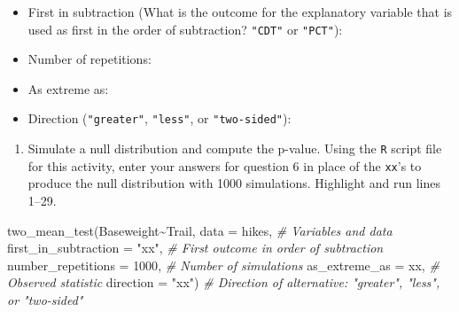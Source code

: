 \documentclass[
]{report}
\newenvironment{Shaded}{\begin{snugshade}}{\end{snugshade}}
\newcommand{\AttributeTok}[1]{\textcolor[rgb]{0.77,0.63,0.00}{#1}}
\newcommand{\CommentTok}[1]{\textcolor[rgb]{0.56,0.35,0.01}{\textit{#1}}}
\newcommand{\DecValTok}[1]{\textcolor[rgb]{0.00,0.00,0.81}{#1}}
\newcommand{\FunctionTok}[1]{\textcolor[rgb]{0.00,0.00,0.00}{#1}}
\newcommand{\NormalTok}[1]{#1}
\newcommand{\SpecialCharTok}[1]{\textcolor[rgb]{0.00,0.00,0.00}{#1}}
\newcommand{\StringTok}[1]{\textcolor[rgb]{0.31,0.60,0.02}{#1}}
\providecommand{\tightlist}{%
  \setlength{\itemsep}{0pt}\setlength{\parskip}{0pt}}
\begin{document}
\vspace{.2in}

\begin{itemize}
\tightlist
\item
  First in subtraction (What is the outcome for the explanatory variable that is used as first in the order of subtraction? \texttt{"CDT"} or \texttt{"PCT"}):
\end{itemize}

\vspace{.2in}

\begin{itemize}
\tightlist
\item
  Number of repetitions:
\end{itemize}

\vspace{.2in}

\begin{itemize}
\tightlist
\item
  As extreme as:
\end{itemize}

\vspace{.2in}

\begin{itemize}
\tightlist
\item
  Direction (\texttt{"greater"}, \texttt{"less"}, or \texttt{"two-sided"}):
\end{itemize}

\vspace{.2in}

\begin{enumerate}
\def\labelenumi{\arabic{enumi}.}
\setcounter{enumi}{6}
\tightlist
\item
  Simulate a null distribution and compute the p-value. Using the \texttt{R} script file for this activity, enter your answers for question 6 in place of the \texttt{xx}'s to produce the null distribution with 1000 simulations. Highlight and run lines 1--29.
\end{enumerate}

\begin{Shaded}
\begin{Highlighting}[]
\FunctionTok{two\_mean\_test}\NormalTok{(Baseweight}\SpecialCharTok{\textasciitilde{}}\NormalTok{Trail, }\AttributeTok{data =}\NormalTok{ hikes,  }\CommentTok{\# Variables and data}
         \AttributeTok{first\_in\_subtraction =} \StringTok{"xx"}\NormalTok{, }\CommentTok{\# First outcome in order of subtraction}
         \AttributeTok{number\_repetitions =} \DecValTok{1000}\NormalTok{,  }\CommentTok{\# Number of simulations}
         \AttributeTok{as\_extreme\_as =}\NormalTok{ xx,  }\CommentTok{\# Observed statistic}
         \AttributeTok{direction =} \StringTok{"xx"}\NormalTok{)  }\CommentTok{\# Direction of alternative: "greater", "less", or "two{-}sided"}
\end{Highlighting}
\end{Shaded}
\end{document}
